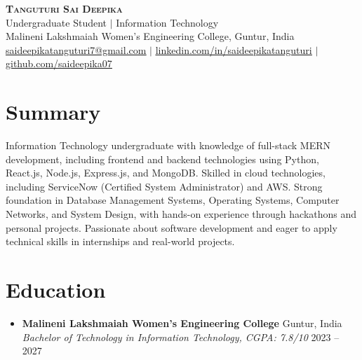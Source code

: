\documentclass[letterpaper,11pt]{article}
\begin{document}
\begin{center}
    \textbf{\Huge \scshape Tanguturi Sai Deepika} \\ \vspace{2pt}
    Undergraduate Student $|$ Information Technology \\
    Malineni Lakshmaiah Women's Engineering College, Guntur, India \\ \vspace{2pt}
    \small \href{mailto:saideepikatanguturi7@gmail.com}{\underline{saideepikatanguturi7@gmail.com}} $|$ 
    \href{https://linkedin.com/in/saideepikatanguturi}{\underline{linkedin.com/in/saideepikatanguturi}} $|$
    \href{https://github.com/saideepika07}{\underline{github.com/saideepika07}}
\end{center}

\section{Summary}
Information Technology undergraduate with knowledge of full-stack MERN development, including frontend and backend technologies using Python, React.js, Node.js, Express.js, and MongoDB. Skilled in cloud technologies, including ServiceNow (Certified System Administrator) and AWS. Strong foundation in Database Management Systems, Operating Systems, Computer Networks, and System Design, with hands-on experience through hackathons and personal projects. Passionate about software development and eager to apply technical skills in internships and real-world projects.

\section{Education}
  \begin{itemize}[leftmargin=0.15in, label={}]
    \item
      \textbf{Malineni Lakshmaiah Women's Engineering College} \hfill Guntur, India \\
      \textit{Bachelor of Technology in Information Technology, CGPA: 7.8/10} \hfill 2023 -- 2027
  \end{itemize}
\end{document}
